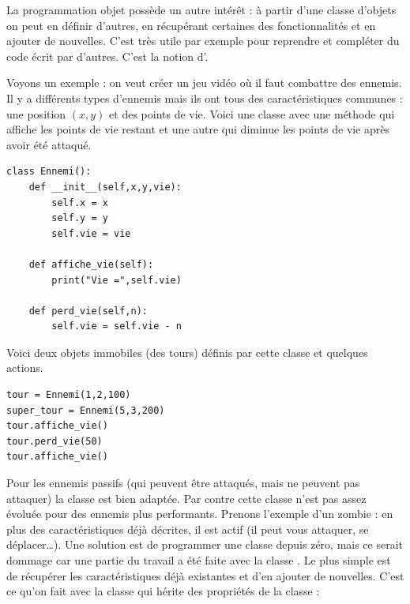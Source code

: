 \documentclass[11pt,class=report,crop=false]{standalone}
\begin{document}



\begin{cours}


La programmation objet possède un autre intérêt : à partir d'une classe d'objets on peut en définir d'autres, en récupérant certaines des fonctionnalités et en ajouter de nouvelles. C'est très utile par exemple pour reprendre et compléter du code écrit par d'autres. C'est la notion d'.

Voyons un exemple : on veut créer un jeu vidéo où il faut combattre des ennemis. Il y a différents types d'ennemis mais ils ont tous des caractéristiques communes : une position $(x,y)$ et des points de vie. 
Voici une classe  avec une méthode qui affiche les points de vie restant et une autre qui diminue les points de vie après avoir été attaqué.

\begin{lstlisting}
class Ennemi():
    def __init__(self,x,y,vie):
        self.x = x
        self.y = y
        self.vie = vie

    def affiche_vie(self):
        print("Vie =",self.vie)

    def perd_vie(self,n):
        self.vie = self.vie - n
\end{lstlisting}

Voici deux objets immobiles (des tours) définis par cette classe  
et quelques actions.
\begin{lstlisting}
tour = Ennemi(1,2,100)
super_tour = Ennemi(5,3,200)
tour.affiche_vie()
tour.perd_vie(50)
tour.affiche_vie()
\end{lstlisting}

\medskip

Pour les ennemis passifs (qui peuvent être attaqués, mais ne peuvent pas attaquer)
la classe  est bien adaptée.
Par contre cette classe n'est pas assez évoluée pour des ennemis plus performants. Prenons l'exemple d'un zombie : en plus des caractéristiques déjà décrites, il est actif (il peut vous attaquer, se déplacer\ldots). Une solution est de programmer une classe  depuis zéro, mais ce serait dommage car une partie du travail a été faite avec la classe . Le plus simple est de récupérer les caractéristiques déjà existantes et d'en ajouter de nouvelles. C'est ce qu'on fait avec la classe  qui hérite des propriétés de la classe  :


\end{cours}
\end{document}
